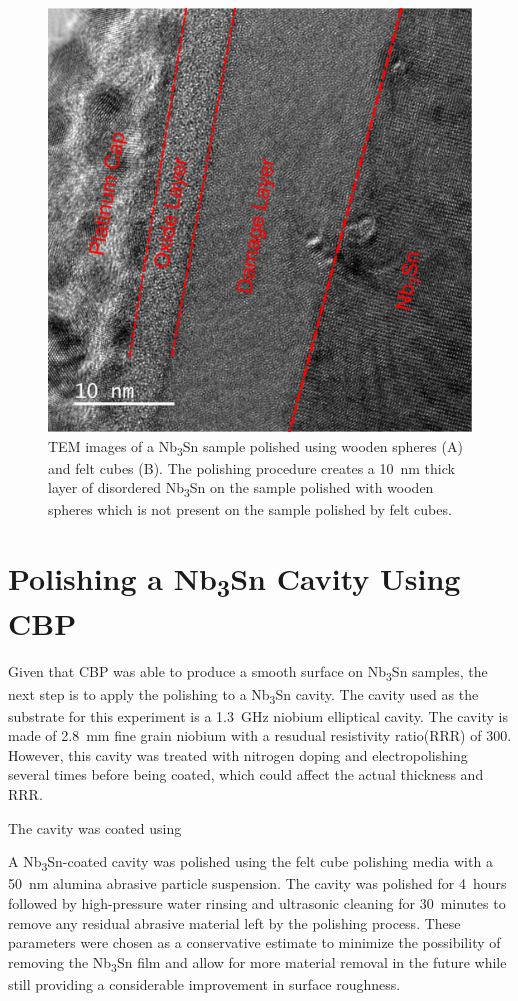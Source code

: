 \documentclass[reprint,amsmath,amssymb,aps]{revtex4-2}%
\begin{document}
\begin{figure}[t]%
\centering%
\includegraphics[width=0.8\columnwidth]{../doc/figs/Sample_Surface_Damage_Layer.png}%
\caption{TEM images of a Nb\textsubscript{3}Sn sample polished using wooden spheres (A) and felt cubes (B). The polishing procedure creates a 10~nm thick layer of disordered Nb\textsubscript{3}Sn on the sample polished with wooden spheres which is not present on the sample polished by felt cubes.}%
\label{fig:samplesurfacedamagelayer}%
\end{figure}

%
\section{Polishing a Nb\textsubscript{3}Sn Cavity Using CBP}%
\label{sec:cavitycbp}%
Given that CBP was able to produce a smooth surface on Nb\textsubscript{3}Sn samples, the next step is to apply the polishing to a Nb\textsubscript{3}Sn cavity. The cavity used as the substrate for this experiment is a 1.3~GHz niobium elliptical cavity. The cavity is made of 2.8~mm fine grain niobium with a resudual resistivity ratio(RRR) of 300. However, this cavity was treated with nitrogen doping and electropolishing several times before being coated, which could affect the actual thickness and RRR.

The cavity was coated using 

A Nb\textsubscript{3}Sn-coated cavity was polished using the felt cube polishing media with a 50~nm alumina abrasive particle suspension. The cavity was polished for 4~hours followed by high-pressure water rinsing and ultrasonic cleaning for 30~minutes to remove any residual abrasive material left by the polishing process. These parameters were chosen as a conservative estimate to minimize the possibility of removing the Nb\textsubscript{3}Sn film and allow for more material removal in the future while still providing a considerable improvement in surface roughness.
\end{document}
